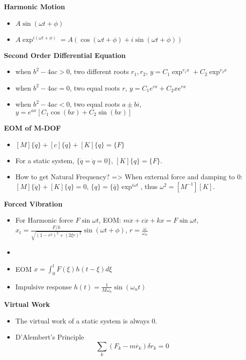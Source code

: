 \documentclass{article}
\begin{document}
\thispagestyle{empty}

\begin{multicols*}{2}

  \noindent\textbf{Harmonic Motion}
  \begin{itemize}
    \item $A \sin(\omega t + \phi)$
    \item $A \exp^{i(\omega t + \phi)} = A(\cos(\omega t + \phi) + i\sin(\omega t + \phi))$
  \end{itemize}

  \noindent\textbf{Second Order Differential Equation}
  \begin{itemize}
  \item when $b^2 - 4ac > 0$, two different roots $r_1, r_2$, $y = C_1\exp^{r_1 x} + C_2\exp^{r_2 x}$
  \item when $b^2 - 4ac = 0$, two equal roots $r$, $y = C_1 e^{r x} + C_2 x e^{r x}$
  \item when $b^2 - 4ac < 0$, two equal roots $a \pm bi$, $y = e^{ax} [C_1 \cos(b x) + C_2 \sin(b x)]$
  \end{itemize}

  \noindent\textbf{EOM of M-DOF}
  \begin{itemize}
  \item $[M]\{\ddot{q}\} + [c]\{\dot{q}\} + [K]\{q\}=\{F\}$
  \item For a static system, $\{\dot{q} = \ddot{q} = 0\}$, $[K]\{q\}=\{F\}$.
  \item How to get Natural Frequency? => When external force and damping to 0:
    $[M]\{\ddot{q}\} + [K]\{q\} = 0$, $\{q\} = \{\bar{q}\}\exp^{i\omega t}$, thus $\omega^2 = [M^{-1}][K]$.
  \end{itemize}

  \noindent\textbf{Forced Vibration}
  \begin{itemize}
  \item For Harmonic force $F\sin\omega t$, EOM: $m\ddot{x} + c\dot{x} + kx = F\sin\omega t$, $x_t = \frac{F/k}{\sqrt{(1-r^2)^2+(2\xi r)^2}}\sin(\omega t + \phi)$, $r=\frac{\omega}{\omega_n}$
    \item
  \item EOM $x = \int_0^t F(\xi) h(t-\xi) d\xi$
  \item Impulsive response $h(t) = \frac{1}{M\omega_n}\sin(\omega_n t)$

  \end{itemize}

  \noindent\textbf{Virtual Work}
  \begin{itemize}
  \item The virtual work of a static system is always 0.
  \item D'Alembert's Principle
    \begin{equation*}
      \sum_k (F_k - m \ddot{r_k}) \delta r_k = 0
    \end{equation*}
  \end{itemize}


\end{multicols*}
\end{document}
